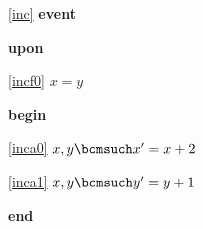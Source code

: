 \noindent \ref{inc}  \textbf{event}
\begin{block}
  \item   \textbf{upon}
  \begin{block}
  \item[ \eqref{incf0} ]$x = y $ %
  \end{block}
  \item   \textbf{begin}
  \begin{block}
  \item[ \eqref{inca0} ]$x,y \bcmsuch x' = x + 2	$ %
  \item[ \eqref{inca1} ]$x,y \bcmsuch y' = y + 1	$ %
  \end{block}
  \item   \textbf{end} \\
\end{block}
